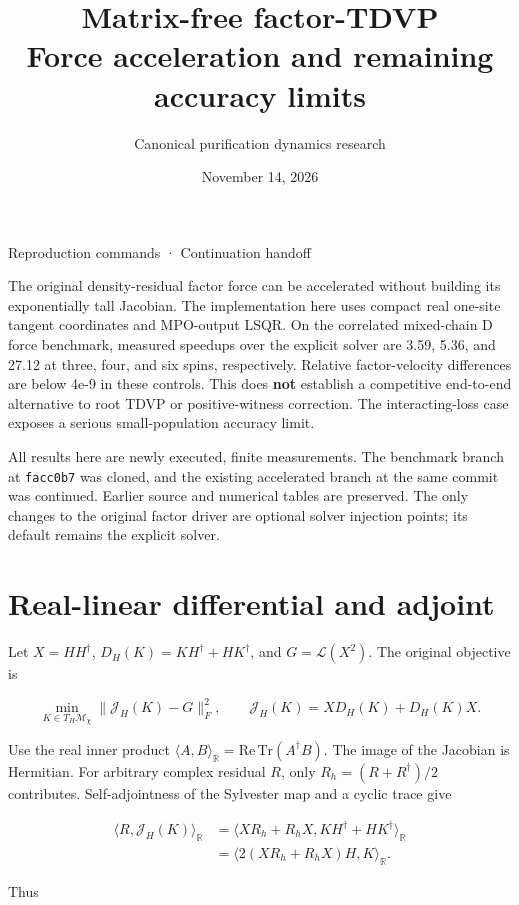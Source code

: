 \documentclass[10pt]{article}
\title{Matrix-free factor-TDVP\\Force acceleration and remaining accuracy limits}
\author{Canonical purification dynamics research}
\date{November 14, 2026}
\begin{document}
\maketitle

Reproduction commands · Continuation handoff

The original density-residual factor force can be accelerated without building
its exponentially tall Jacobian. The implementation here uses compact real
one-site tangent coordinates and MPO-output LSQR. On the correlated mixed-chain
D force benchmark, measured speedups over the explicit solver are 3.59, 5.36,
and 27.12 at three, four, and six spins, respectively. Relative factor-velocity
differences are below 4e-9 in these controls. This does \textbf{not} establish a
competitive end-to-end alternative to root TDVP or positive-witness correction.
The interacting-loss case exposes a serious small-population accuracy limit.

All results here are newly executed, finite measurements. The benchmark branch
at \texttt{facc0b7} was cloned, and the existing accelerated branch at the same commit
was continued. Earlier source and numerical tables are preserved. The only
changes to the original factor driver are optional solver injection points;
its default remains the explicit solver.

\section*{Real-linear differential and adjoint}

Let $X=HH^\dagger$, $D_H(K)=KH^\dagger+HK^\dagger$, and
$G=\mathcal L(X^2)$. The original objective is

\[
\min_{K\in T_H\mathcal M_\chi}\|\mathcal J_H(K)-G\|_F^2,
\qquad \mathcal J_H(K)=XD_H(K)+D_H(K)X.
\]

Use the real inner product $\langle A,B\rangle_{\mathbb R}=\mathrm{Re}\,\mathrm{Tr}(A^\dagger B)$.
The image of the Jacobian is Hermitian. For arbitrary complex residual $R$,
only $R_h=(R+R^\dagger)/2$ contributes. Self-adjointness of the Sylvester map
and a cyclic trace give

\[
\begin{aligned}
\langle R,\mathcal J_H(K)\rangle_{\mathbb R}
&=\langle XR_h+R_hX,KH^\dagger+HK^\dagger\rangle_{\mathbb R}\\
&=\langle 2(XR_h+R_hX)H,K\rangle_{\mathbb R}.
\end{aligned}
\]

Thus
\end{document}
